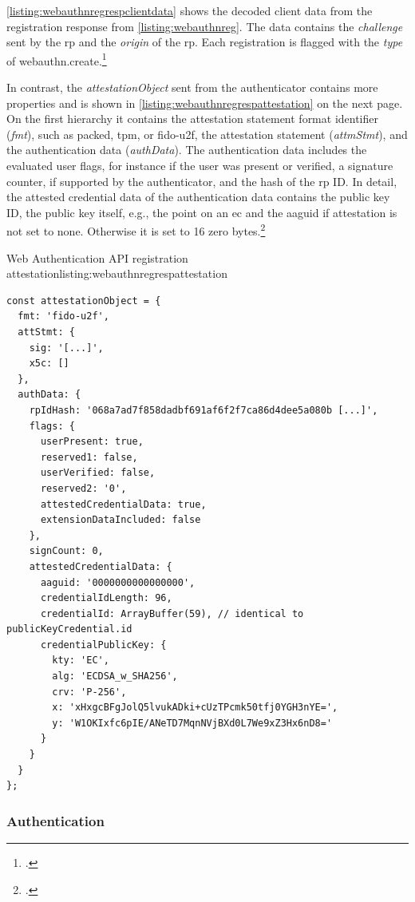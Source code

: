 \autoref{listing:webauthnregrespclientdata} shows the decoded client data from the \wa{} registration response from \autoref{listing:webauthnreg}. The data contains the \textit{challenge} sent by the \gls{rp} and the \textit{origin} of the \gls{rp}. Each registration is flagged with the \textit{type} of \frqq webauthn.create\flqq.\footcites[See][Chapter 5.10.1]{w3c}

In contrast, the \textit{attestationObject} sent from the authenticator contains more properties and is shown in \autoref{listing:webauthnregrespattestation} on the next page. On the first hierarchy it contains the attestation statement format identifier (\textit{fmt}), such as \frqq packed, tpm, or fido-u2f\flqq, the attestation statement (\textit{attmStmt}), and the authentication data (\textit{authData}). The authentication data includes the evaluated user flags, for instance if the user was present or verified, a signature counter, if supported by the authenticator, and the hash of the \gls{rp} ID. In detail, the attested credential data of the authentication data contains the public key ID, the public key itself, e.g., the point on an \gls{ec} and the \gls{aaguid} if attestation is not set to none. Otherwise it is set to 16 zero bytes.\footcites[See][Chapter 5.1.3, 6.1]{w3c}

\begin{example}{Web Authentication API registration attestation}{listing:webauthnregrespattestation}
\begin{verbatim}
const attestationObject = {
  fmt: 'fido-u2f',
  attStmt: {
    sig: '[...]',
    x5c: []
  },
  authData: {
    rpIdHash: '068a7ad7f858dadbf691af6f2f7ca86d4dee5a080b [...]',
    flags: {
      userPresent: true,
      reserved1: false,
      userVerified: false,
      reserved2: '0',
      attestedCredentialData: true,
      extensionDataIncluded: false
    },
    signCount: 0,
    attestedCredentialData: {
      aaguid: '0000000000000000',
      credentialIdLength: 96,
      credentialId: ArrayBuffer(59), // identical to publicKeyCredential.id
      credentialPublicKey: {
        kty: 'EC',
        alg: 'ECDSA_w_SHA256',
        crv: 'P-256',
        x: 'xHxgcBFgJolQ5lvukADki+cUzTPcmk50tfj0YGH3nYE=',
        y: 'W1OKIxfc6pIE/ANeTD7MqnNVjBXd0L7We9xZ3Hx6nD8='
      }
    }
  }
};
\end{verbatim}
\end{example}

\subsubsection{Authentication}

